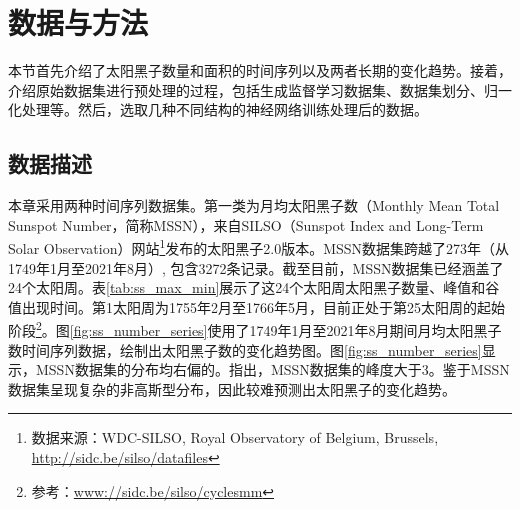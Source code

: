 \section{数据与方法}\label{sec:ss_data_method}

本节首先介绍了太阳黑子数量和面积的时间序列以及两者长期的变化趋势。接着，介绍原始数据集进行预处理的过程，包括生成监督学习数据集、数据集划分、归一化处理等。然后，选取几种不同结构的神经网络训练处理后的数据。

\subsection{数据描述}\label{sec:ss_dataset}

本章采用两种时间序列数据集。第一类为月均太阳黑子数（Monthly Mean Total Sunspot Number，简称MSSN），来自SILSO（Sunspot Index and Long-Term Solar Observation）网站\footnote{数据来源：WDC-SILSO, Royal Observatory of Belgium, Brussels, \href{http://sidc.be/silso/datafiles}{http://sidc.be/silso/datafiles}}发布的太阳黑子2.0版本。MSSN数据集跨越了273年（从1749年1月至2021年8月）, 包含3272条记录。截至目前，MSSN数据集已经涵盖了24个太阳周。表\ref{tab:ss_max_min}展示了这24个太阳周太阳黑子数量、峰值和谷值出现时间。第1太阳周为1755年2月至1766年5月，目前正处于第25太阳周的起始阶段\footnote{参考：\href{www://sidc.be/silso/cyclesmm}{www://sidc.be/silso/cyclesmm}}。图\ref{fig:ss_number_series}使用了1749年1月至2021年8月期间月均太阳黑子数时间序列数据，绘制出太阳黑子数的变化趋势图。图\ref{fig:ss_number_series}显示，MSSN数据集的分布均右偏的。\citet{panigrahi2021forecasting}指出，MSSN数据集的峰度大于3。鉴于MSSN数据集呈现复杂的非高斯型分布，因此较难预测出太阳黑子的变化趋势。

